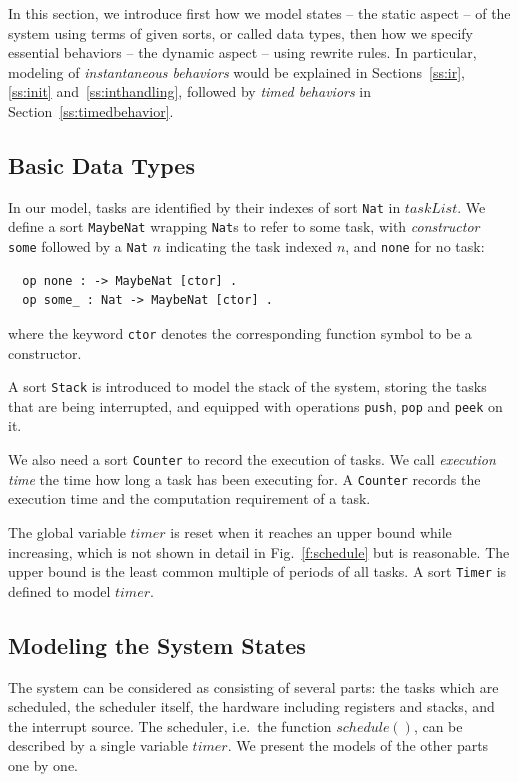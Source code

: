 \documentclass[journal]{IEEEtranTIE}
\begin{document}
In this section, we introduce first how we model states -- the static
aspect -- of the system using terms of given sorts, or called data
types, then how we specify essential behaviors -- the dynamic aspect
-- using rewrite rules. In particular, modeling of \emph{instantaneous
  behaviors} would be explained in Sections~\ref{ss:ir}, \ref{ss:init}
and~\ref{ss:inthandling}, followed by \emph{timed behaviors} in
Section~\ref{ss:timedbehavior}.

\subsection{Basic Data Types}
In our model, tasks are identified by their indexes of sort \verb|Nat|
in $\mathit{taskList}$. We define a sort \verb|MaybeNat| wrapping
\verb|Nat|s to refer to some task, with \emph{constructor} \verb|some|
followed by a \verb|Nat| $n$ indicating the task indexed $n$, and
\verb|none| for no task:
\begin{verbatim}
  op none : -> MaybeNat [ctor] .
  op some_ : Nat -> MaybeNat [ctor] .
\end{verbatim}
where the keyword \verb|ctor| denotes the corresponding function
symbol to be a constructor.

A sort \verb|Stack| is introduced to model the stack of the system,
storing the tasks that are being interrupted, and equipped with
operations \verb|push|, \verb|pop| and \verb|peek| on it.

We also need a sort \verb|Counter| to record the execution of tasks.
We call \emph{execution time} the time how long a task has been
executing for. A \verb|Counter| records the execution time and the
computation requirement of a task.

The global variable $\mathit{timer}$ is reset when it reaches an upper
bound while increasing, which is not shown in detail in
Fig.~\ref{f:schedule} but is reasonable. The upper bound is the least
common multiple of periods of all tasks. A sort \verb|Timer| is
defined to model $\mathit{timer}$.

\subsection{Modeling the System States}
The system can be considered as consisting of several parts: the tasks
which are scheduled, the scheduler itself, the hardware including
registers and stacks, and the interrupt source. The scheduler,
i.e.\ the function $\mathit{schedule()}$, can be described by a single
variable $\mathit{timer}$. We present the models of the other parts
one by one.
\end{document}
